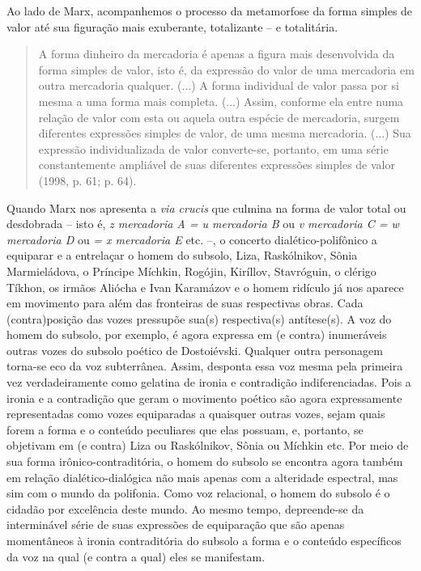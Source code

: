 Ao lado de Marx, acompanhemos o processo da metamorfose da forma simples
de valor até sua figuração mais exuberante, totalizante -- e
totalitária.

\begin{quote}
A forma dinheiro da mercadoria é apenas a figura mais desenvolvida da
forma simples de valor, isto é, da expressão do valor de uma mercadoria
em outra mercadoria qualquer. (...) A forma individual de valor passa
por si mesma a uma forma mais completa. (...) Assim, conforme ela entre
numa relação de valor com esta ou aquela outra espécie de mercadoria,
surgem diferentes expressões simples de valor, de uma mesma mercadoria.
(...) Sua expressão individualizada de valor converte-se, portanto, em
uma série constantemente ampliável de suas diferentes expressões simples
de valor (1998, p. 61; p. 64).
\end{quote}

Quando Marx nos apresenta a \emph{via crucis} que culmina na forma de
valor total ou desdobrada -- isto é, \emph{z mercadoria A = u mercadoria
B} ou \emph{v mercadoria C = w mercadoria D} ou \emph{= x mercadoria E}
etc. --, o concerto dialético-polifônico a equiparar e a entrelaçar o
homem do subsolo, Liza, Raskólnikov, Sônia Marmieládova, o Príncipe
Míchkin, Rogójin, Kiríllov, Stavróguin, o clérigo Tíkhon, os irmãos
Aliócha e Ivan Karamázov e o homem ridículo já nos aparece em movimento
para além das fronteiras de suas respectivas obras. Cada (contra)posição
das vozes pressupõe sua(s) respectiva(s) antítese(s). A voz do homem do
subsolo, por exemplo, é agora expressa em (e contra) inumeráveis outras
vozes do subsolo poético de Dostoiévski. Qualquer outra personagem
torna-se eco da voz subterrânea. Assim, desponta essa voz mesma pela
primeira vez verdadeiramente como gelatina de ironia e contradição
indiferenciadas. Pois a ironia e a contradição que geram o movimento
poético são agora expressamente representadas como vozes equiparadas a
quaisquer outras vozes, sejam quais forem a forma e o conteúdo
peculiares que elas possuam, e, portanto, se objetivam em (e contra)
Liza ou Raskólnikov, Sônia ou Míchkin etc. Por meio de sua forma
irônico-contraditória, o homem do subsolo se encontra agora também em
relação dialético-dialógica não mais apenas com a alteridade espectral,
mas sim com o mundo da polifonia. Como voz relacional, o homem do
subsolo é o cidadão por excelência deste mundo. Ao mesmo tempo,
depreende-se da interminável série de suas expressões de equiparação que
são apenas momentâneos à ironia contraditória do subsolo a forma e o
conteúdo específicos da voz na qual (e contra a qual) eles se
manifestam.

